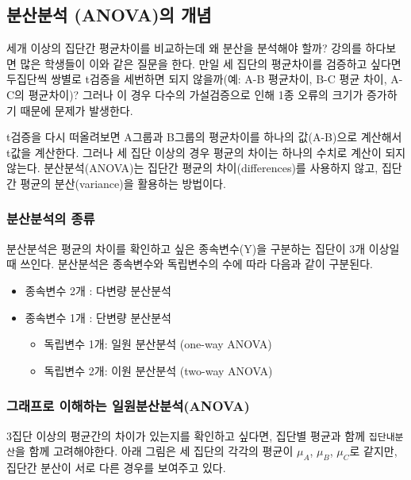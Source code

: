 \documentclass[
]{book}
\providecommand{\tightlist}{%
  \setlength{\itemsep}{0pt}\setlength{\parskip}{0pt}}
\begin{document}
\subsection{분산분석 (ANOVA)의 개념}\label{uxbd84uxc0b0uxbd84uxc11d-anovauxc758-uxac1cuxb150}

세개 이상의 집단간 평균차이를 비교하는데 왜 분산을 분석해야 할까? 강의를 하다보면 많은 학생들이 이와 같은 질문을 한다. 만일 세 집단의 평균차이를 검증하고 싶다면 두집단씩 쌍별로 t검증을 세번하면 되지 않을까(예: A-B 평균차이, B-C 평균 차이, A-C의 평균차이)? 그러나 이 경우 다수의 가설검증으로 인해 1종 오류의 크기가 증가하기 때문에 문제가 발생한다.

t검증을 다시 떠올려보면 A그룹과 B그룹의 평균차이를 하나의 값(A-B)으로 계산해서 t값을 계산한다. 그러나 세 집단 이상의 경우 평균의 차이는 하나의 수치로 계산이 되지 않는다. 분산분석(ANOVA)는 집단간 평균의 차이(differences)를 사용하지 않고, 집단간 평균의 분산(variance)을 활용하는 방법이다.

\subsubsection{분산분석의 종류}\label{uxbd84uxc0b0uxbd84uxc11duxc758-uxc885uxb958}

분산분석은 평균의 차이를 확인하고 싶은 종속변수(Y)을 구분하는 집단이 3개 이상일때 쓰인다. 분산분석은 종속변수와 독립변수의 수에 따라 다음과 같이 구분된다.

\begin{itemize}
\tightlist
\item
  종속변수 2개 : 다변량 분산분석
\item
  종속변수 1개 : 단변량 분산분석

  \begin{itemize}
  \tightlist
  \item
    독립변수 1개: 일원 분산분석 (one-way ANOVA)
  \item
    독립변수 2개: 이원 분산분석 (two-way ANOVA)
  \end{itemize}
\end{itemize}

\subsubsection{그래프로 이해하는 일원분산분석(ANOVA)}\label{uxadf8uxb798uxd504uxb85c-uxc774uxd574uxd558uxb294-uxc77cuxc6d0uxbd84uxc0b0uxbd84uxc11danova}

3집단 이상의 평균간의 차이가 있는지를 확인하고 싶다면, 집단별 평균과 함께 \texttt{집단내분산}을 함께 고려해야한다. 아래 그림은 세 집단의 각각의 평균이 \(\mu_A\), \(\mu_B\), \(\mu_C\)로 같지만, 집단간 분산이 서로 다른 경우를 보여주고 있다.
\end{document}
